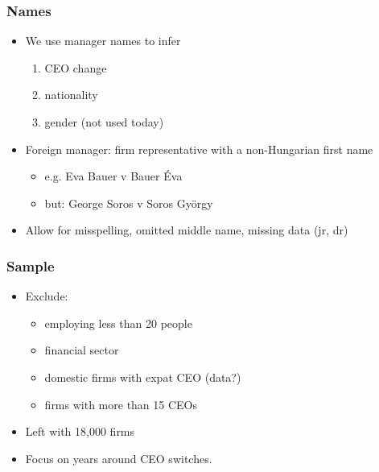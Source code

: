 \documentclass[aspectratio=169,compress,mathserif]{beamer}
\begin{document}
\begin{frame}\frametitle{Names}\hypertarget{Names}{}
\begin{itemize}
\item We use manager names to infer 
\begin{enumerate}\setcounter{enumi}{0}
\item CEO change

\item nationality

\item gender (not used today)
\end{enumerate}

\item Foreign manager: firm representative with a non-Hungarian first name
\begin{itemize}
\item e.g. Eva Bauer v Bauer Éva

\item but: George Soros v Soros György
\end{itemize}

\item Allow for misspelling, omitted middle name, missing data (jr, dr)


\end{itemize}
\end{frame}



\begin{frame}\frametitle{Sample}\hypertarget{Sample}{}
\begin{itemize}
\item Exclude: 
\begin{itemize}
\item employing less than 20 people

\item financial sector

\item domestic firms with expat CEO (data?)

\item firms with more than 15 CEOs
\end{itemize}

\item Left with 18,000 firms

\item Focus on years around CEO switches.


\end{itemize}
\end{frame}
\end{document}
